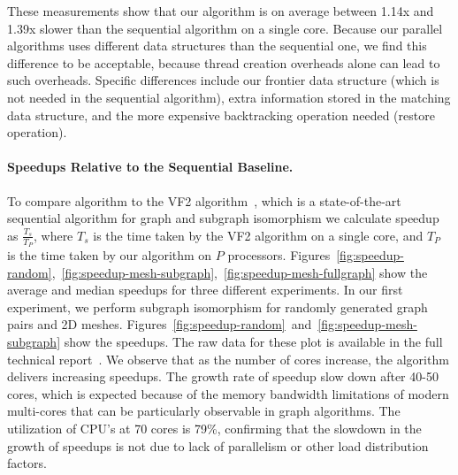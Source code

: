 These measurements show that our algorithm is on average between 1.14x and 1.39x
slower than the sequential algorithm on a single core.
%
Because our parallel algorithms uses different data structures than
the sequential one, we find this difference to be acceptable, because
thread creation overheads alone can lead to such overheads.
%
Specific differences include our frontier data structure (which is not
needed in the sequential algorithm), extra information stored in the
matching data structure,  and the more expensive backtracking
operation needed (restore operation).




\paragraph{Speedups Relative to the Sequential Baseline.}
To compare algorithm to the VF2 algorithm~\cite{VF2}, which is a
state-of-the-art sequential algorithm for graph and subgraph
isomorphism we calculate speedup as $\frac{T_{s}}{T_{P}}$, where
$T_{s}$ is the time taken by the VF2 algorithm on a single core, and
$T_{P}$ is the time taken by our algorithm on $P$ processors.
%
Figures~\ref{fig:speedup-random},~\ref{fig:speedup-mesh-subgraph},~\ref{fig:speedup-mesh-fullgraph}
show the average and median speedups for three different experiments.
%
In our first experiment, we perform subgraph isomorphism for randomly
generated graph pairs and 2D meshes.
%
Figures~\ref{fig:speedup-random}~and~\ref{fig:speedup-mesh-subgraph}
show the speedups.
%
The raw data for these plot is available in the full technical
report~\cite{YA-iso-18}.
%
We observe that as the number of cores increase, the
algorithm delivers increasing speedups.
%
The growth rate of speedup slow down after 40-50 cores, which is
expected because of the memory bandwidth limitations of modern
multi-cores that can be particularly observable in graph algorithms.
%
The utilization of CPU's at 70 cores is 79\%, confirming that the
slowdown in the growth of speedups is not due to lack of parallelism
or other load distribution factors.

